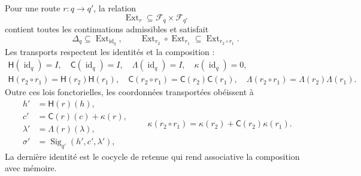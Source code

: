 Pour une route \(r:q\to q'\), la relation
\begin{equation}
\operatorname{Ext}_r\subseteq\mathcal F_q\times\mathcal F_{q'}
\label{p12-83-c3-s1:eq:tpk-extension-relation}
\end{equation}
contient toutes les continuations admissibles et satisfait
\[
\Delta_q\subseteq\operatorname{Ext}_{\operatorname{id}_q},
\qquad
\operatorname{Ext}_{r_2}\circ\operatorname{Ext}_{r_1}
\subseteq\operatorname{Ext}_{r_2\circ r_1}.
\]
Les transports respectent les identités et la composition :
\begin{equation}
\begin{gathered}
\mathsf H(\operatorname{id}_q)=I,
\quad \mathsf C(\operatorname{id}_q)=I,
\quad \mathsf\Lambda(\operatorname{id}_q)=I,
\quad \kappa(\operatorname{id}_q)=0,\\
\mathsf H(r_2\!\circ r_1)=\mathsf H(r_2)\mathsf H(r_1),
\quad
\mathsf C(r_2\!\circ r_1)=\mathsf C(r_2)\mathsf C(r_1),
\quad
\mathsf\Lambda(r_2\!\circ r_1)=
\mathsf\Lambda(r_2)\mathsf\Lambda(r_1).
\end{gathered}
\label{p12-83-c3-s1:eq:tpk-functorial-transport}
\end{equation}
Outre ces lois fonctorielles, les coordonnées transportées obéissent à
\begin{equation}
\begin{aligned}
h'&=\mathsf H(r)(h),\\
c'&=\mathsf C(r)(c)+\kappa(r),\\
\lambda'&=\mathsf\Lambda(r)(\lambda),\\
\sigma'&=\operatorname{Sig}_{q'}(h',c',\lambda'),
\end{aligned}
\qquad
\kappa(r_2\circ r_1)
=\kappa(r_2)+\mathsf C(r_2)\kappa(r_1).
\label{p12-83-c3-s1:eq:tpk-typed-transport}
\end{equation}
La dernière identité est le cocycle de retenue qui rend associative la
composition avec mémoire.

